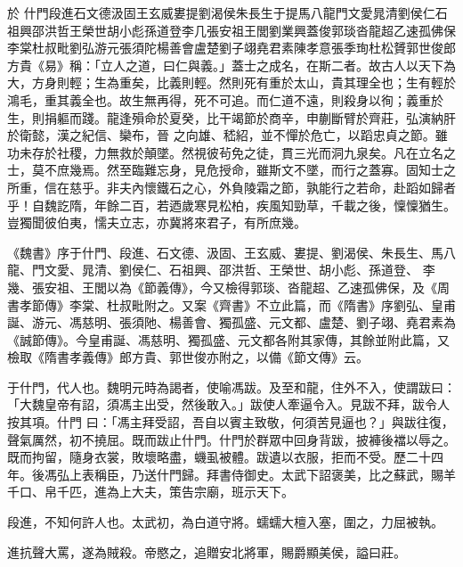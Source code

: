 
\begin{pinyinscope}

 於
 什門段進石文德汲固王玄威婁提劉渴侯朱長生于提馬八龍門文愛晁清劉侯仁石祖興邵洪哲王榮世胡小彪孫道登李几張安祖王閭劉業興蓋俊郭琰沓龍超乙速孤佛保
 李棠杜叔毗劉弘游元張須陀楊善會盧楚劉子翊堯君素陳孝意張季珣杜松贇郭世俊郎方貴《易》稱：「立人之道，曰仁與義。」蓋士之成名，在斯二者。故古人以天下為大，方身則輕；生為重矣，比義則輕。然則死有重於太山，貴其理全也；生有輕於鴻毛，重其義全也。故生無再得，死不可追。而仁道不遠，則殺身以徇；義重於生，則捐軀而踐。龍逢殞命於夏癸，比干竭節於商辛，申蒯斷臂於齊莊，弘演納肝於衛懿，漢之紀信、欒布，晉
 之向雄、嵇紹，並不憚於危亡，以蹈忠貞之節。雖功未存於社稷，力無救於顛墜。然視彼茍免之徒，貫三光而洞九泉矣。凡在立名之士，莫不庶幾焉。然至臨難忘身，見危授命，雖斯文不墜，而行之蓋寡。固知士之所重，信在慈乎。非夫內懷鐵石之心，外負陵霜之節，孰能行之若命，赴蹈如歸者乎！自魏訖隋，年餘二百，若迺歲寒見松柏，疾風知勁草，千載之後，懍懍猶生。豈獨聞彼伯夷，懦夫立志，亦冀將來君子，有所庶幾。



 《魏書》序于什門、段進、石文德、汲固、王玄威、婁提、劉渴侯、朱長生、馬八龍、門文愛、晁清、劉侯仁、石祖興、邵洪哲、王榮世、胡小彪、孫道登、
 李幾、張安祖、王閭以為《節義傳》，今又檢得郭琰、沓龍超、乙速孤佛保，及《周書孝節傳》李棠、杜叔毗附之。又案《齊書》不立此篇，而《隋書》序劉弘、皇甫誕、游元、馮慈明、張須阤、楊善會、獨孤盛、元文都、盧楚、劉子翊、堯君素為《誠節傳》。今皇甫誕、馮慈明、獨孤盛、元文都各附其家傳，其餘並附此篇，又檢取《隋書孝義傳》郎方貴、郭世俊亦附之，以備《節文傳》云。



 于什門，代人也。魏明元時為謁者，使喻馮跋。及至和龍，住外不入，使謂跋曰：「大魏皇帝有詔，須馮主出受，然後敢入。」跋使人牽逼令入。見跋不拜，跋令人按其項。什門
 曰：「馮主拜受詔，吾自以賓主致敬，何須苦見逼也？」與跋往復，聲氣厲然，初不撓屈。既而跋止什門。什門於群眾中回身背跋，披褲後襠以辱之。既而拘留，隨身衣裳，敗壞略盡，蟣虱被體。跋遺以衣服，拒而不受。歷二十四年。後馮弘上表稱臣，乃送什門歸。拜書侍御史。太武下詔褒美，比之蘇武，賜羊千口、帛千匹，進為上大夫，策告宗廟，班示天下。



 段進，不知何許人也。太武初，為白道守將。蠕蠕大檀入塞，圍之，力屈被執。



 進抗聲大罵，遂為賊殺。帝愍之，追贈安北將軍，賜爵顯美侯，謚曰莊。




\end{pinyinscope}
